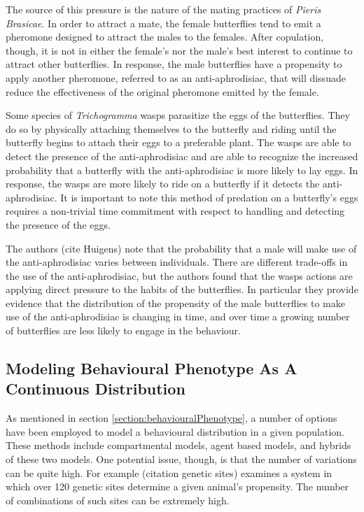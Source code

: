 \documentclass[12pt]{article}
\begin{document}
The source of this pressure is the nature of the mating practices of
\textit{Pieris Brasicae}. In order to attract a mate, the female
butterflies tend to emit a pheromone designed to attract the males to
the females. After copulation, though, it is not in either the
female's nor the male's best interest to continue to attract other
butterflies. In response, the male butterflies have a propensity to
apply another pheromone, referred to as an anti-aphrodisiac, that will
dissuade reduce the effectiveness of the original pheromone emitted by
the female.

Some species of \textit{Trichogramma} wasps parasitize the eggs of the
butterflies. They do so by physically attaching themselves to the
butterfly and riding until the butterfly begins to attach their eggs
to a preferable plant. The wasps are able to detect the presence of
the anti-aphrodisiac and are able to recognize the increased
probability that a butterfly with the anti-aphrodisiac is more likely
to lay eggs. In response, the wasps are more likely to ride on a
butterfly if it detects the anti-aphrodisiac. It is important to note
this method of predation on a butterfly's eggs requires a non-trivial
time commitment with respect to handling and detecting the presence of
the eggs.

The authors (cite Huigens) note that the probability that a male will
make use of the anti-aphrodisiac varies between individuals. There are
different trade-offs in the use of the anti-aphrodisiac, but the
authors found that the wasps actions are applying direct pressure to
the habits of the butterflies. In particular they provide evidence
that the distribution of the propensity of the male butterflies to
make use of the anti-aphrodisiac is changing in time, and over time a
growing number of butterflies are less likely to engage in the
behaviour.

\subsection{Modeling Behavioural Phenotype As A Continuous
  Distribution}

As mentioned in section \ref{section:behaviouralPhenotype}, a number
of options have been employed to model a behavioural distribution in a
given population. These methods include compartmental models, agent
based models, and hybrids of these two models. One potential issue,
though, is that the number of variations can be quite high. For
example (citation genetic sites) examines a system in which over 120
genetic sites determine a given animal's propensity. The number of
combinations of such sites can be extremely high.
\end{document}
